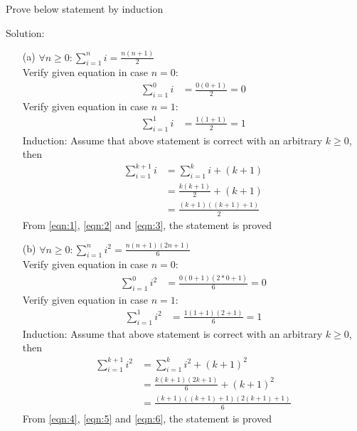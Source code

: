 \newpage
\begin{longfbox}
    \begin{bt} \label{pro:practice2.44}
        Prove below statement by induction
    \end{bt}
\end{longfbox}
Solution:
\begin{enumerate}
    \item[(a)] $\forall n\geq 0: \displaystyle\sum^{n}_{i=1} i = \frac{n(n+1)}{2}$ \\
        Verify given equation in case $n=0$:
            \begin{align}
                \displaystyle\sum^{0}_{i=1} i &= \frac{0(0+1)}{2} = 0 \label{eqn:1}
            \end{align}
        Verify given equation in case $n=1$:
            \begin{align}
                \displaystyle\sum^{1}_{i=1} i &= \frac{1(1+1)}{2} = 1 \label{eqn:2}
            \end{align}
        Induction: Assume that above statement is correct with an arbitrary $k \geq 0$, then\\
        \begin{align}
            \displaystyle\sum^{k+1}_{i=1} i &= \displaystyle\sum^{k}_{i=1} i + (k+1) \\
                                            &= \frac{k(k+1)}{2} + (k+1) \\
                                            &= \frac{(k+1)((k+1)+1)}{2} \label{eqn:3}
        \end{align}
        From \ref{eqn:1}, \ref{eqn:2} and \ref{eqn:3}, the statement is proved
    
    \item[(b)] $\forall n\geq 0: \displaystyle\sum^{n}_{i=1} i^2 = \frac{n(n+1)(2n+1)}{6}$ \\
        Verify given equation in case $n=0$:
            \begin{align}
                \displaystyle\sum^{0}_{i=1} i^2 &= \frac{0(0+1)(2*0+1)}{6} = 0 \label{eqn:4}
            \end{align}
        Verify given equation in case $n=1$:
            \begin{align}
                \displaystyle\sum^{1}_{i=1} i^2 &= \frac{1(1+1)(2+1)}{6} = 1 \label{eqn:5}
            \end{align}
        Induction: Assume that above statement is correct with an arbitrary $k \geq 0$, then\\
        \begin{align}
            \displaystyle\sum^{k+1}_{i=1} i^2 &= \displaystyle\sum^{k}_{i=1} i^2 + (k+1)^2 \\
                                            &= \frac{k(k+1)(2k+1)}{6} + (k+1)^2 \\
                                            &= \frac{(k+1)((k+1)+1)(2(k+1)+1)}{6} \label{eqn:6}
        \end{align}
        From \ref{eqn:4}, \ref{eqn:5} and \ref{eqn:6}, the statement is proved
    

\end{enumerate}

